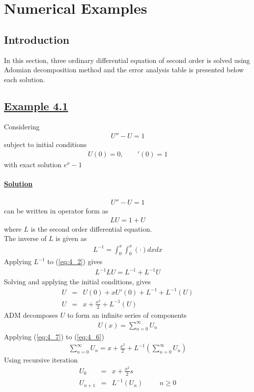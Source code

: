 \documentclass[11pt]{report}
\newcommand{\ubt}[1]{\textbf{\underline{#1}}}
\newcommand{\sps}{\\[0.2cm]}
\newcommand{\refn}[1]{(\ref{#1})}
\newcommand{\refx}[1]{\refn{eq:#1}}
\newcommand{\sprime}{'}
\newcommand{\dprime}{''}
\newcommand{\example}[1]{\section*{\ubt{Example #1}}}
\newcommand{\solution}{\subsubsection{\ubt{Solution}}}
\begin{document}
	\chapter{Numerical Examples}
	\section{Introduction}
	In this section, three ordinary differential equation of second order is solved using Adomian decomposition method and the error analysis table is presented below each solution.
	
	\example{4.1}
	Considering 
	\begin{eqnarray*}
		U\dprime - U = 1
	\end{eqnarray*}
	subject to initial conditions
	\begin{eqnarray*}
		U(0) = 0,~~~~~~~~~\sprime(0) = 1
	\end{eqnarray*}
	with exact solution $e^x - 1$
	\solution
	\begin{eqnarray}
		U\dprime - U = 1
	\end{eqnarray}
	can be written in operator form as
	\begin{eqnarray}
		LU = 1 + U\label{eq:4_2}
	\end{eqnarray}
	where $L$ is the second order differential equation.\\
	The inverse of $L$ is given as
	\begin{eqnarray}
		L^{-1} = \int_0^x\int_0^x(\cdot)dxdx
	\end{eqnarray}
	Applying $L^{-1}$ to \refx{4_2} gives
	\begin{eqnarray}
		L^{-1}LU = L^{-1} + L^{-1}U
	\end{eqnarray}
	Solving and applying the initial conditions, gives
	\begin{eqnarray}
		U &=&U(0) + xU\sprime(0) + L^{-1} + L^{-1}(U)\sps
		U &=& x + \frac{x^2}{2} + L^{-1}(U)\label{eq:4_6}
	\end{eqnarray}
	ADM decomposes $U$ to form an infinite series of components
	\begin{eqnarray}
		U(x) = \sum_{n=0}^{\infty}U_n\label{eq:4_7}
	\end{eqnarray}
	Applying \refx{4_7} to \refx{4_6}
	\begin{eqnarray}
		\sum_{n=0}^{\infty} U_n = x + \frac{x^2}{2} + L^{-1}\left( \sum_{n=0}^\infty U_n \right)
	\end{eqnarray}
	Using recursive iteration
	\begin{eqnarray*}
		U_0 &=& x+ \frac{x^2}{2}s\sps
		U_{n+1} &=& L^{-1}(U_n)\hspace{1cm} n \geq 0 
	\end{eqnarray*}
\end{document}
